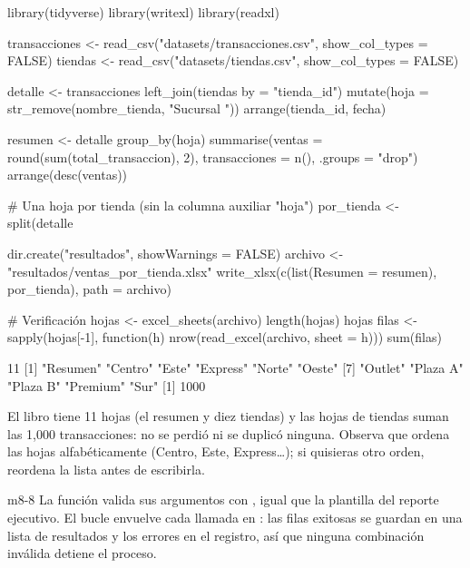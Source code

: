 \begin{rcode}
library(tidyverse)
library(writexl)
library(readxl)

transacciones <- read_csv("datasets/transacciones.csv",
                          show_col_types = FALSE)
tiendas <- read_csv("datasets/tiendas.csv", show_col_types = FALSE)

detalle <- transacciones %
  left_join(tiendas %
            by = "tienda_id") %
  mutate(hoja = str_remove(nombre_tienda, "Sucursal ")) %
  arrange(tienda_id, fecha)

resumen <- detalle %
  group_by(hoja) %
  summarise(ventas = round(sum(total_transaccion), 2),
            transacciones = n(), .groups = "drop") %
  arrange(desc(ventas))

# Una hoja por tienda (sin la columna auxiliar "hoja")
por_tienda <- split(detalle %

dir.create("resultados", showWarnings = FALSE)
archivo <- "resultados/ventas_por_tienda.xlsx"
write_xlsx(c(list(Resumen = resumen), por_tienda), path = archivo)

# Verificación
hojas <- excel_sheets(archivo)
length(hojas)
hojas
filas <- sapply(hojas[-1], function(h) nrow(read_excel(archivo, sheet = h)))
sum(filas)
\end{rcode}
\begin{rsalida}
[1] 11
 [1] "Resumen" "Centro"  "Este"    "Express" "Norte"   "Oeste"  
 [7] "Outlet"  "Plaza A" "Plaza B" "Premium" "Sur"    
[1] 1000
\end{rsalida}

El libro tiene 11 hojas (el resumen y diez tiendas) y las hojas de tiendas
suman las 1,000 transacciones: no se perdió ni se duplicó ninguna. Observa
que  ordena las hojas alfabéticamente (Centro, Este,
Express\ldots); si quisieras otro orden, reordena la lista antes de
escribirla.


\begin{solucion}{m8-8}
La función valida sus argumentos con , igual que la plantilla
del reporte ejecutivo. El bucle envuelve cada llamada en
: las filas exitosas se guardan en una lista de
resultados y los errores en el registro, así que ninguna combinación inválida
detiene el proceso.
\end{solucion}


